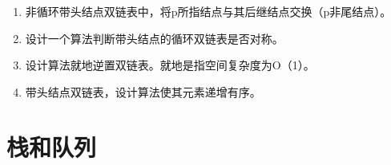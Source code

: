 \documentclass[lang=cn,newtx,10pt,scheme=chinese]{../../elegantbook}
\begin{document}
\begin{enumerate}
\vspace{5cm}
\item
  
  非循环带头结点双链表中，将p所指结点与其后继结点交换（p非尾结点）。
  
\vspace{5cm}
\item
  
  设计一个算法判断带头结点的循环双链表是否对称。
  
\vspace{5cm}
\item
  
  设计算法就地逆置双链表。就地是指空间复杂度为O（1）。
  
\vspace{5cm}
\item
  
  带头结点双链表，设计算法使其元素递增有序。
  
\end{enumerate}

  \chapter{栈和队列}
\end{document}
